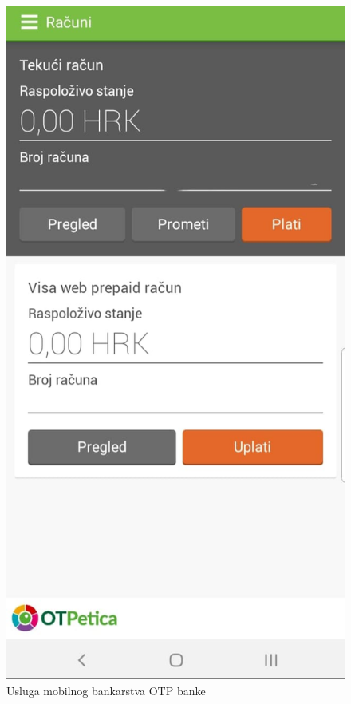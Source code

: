 		\begin{figure}[H]
			\includegraphics[scale=0.25]{slike/motp.JPG}
			\centering
			\caption{Usluga mobilnog bankarstva OTP banke}
			\label{fig:mzaba}
		\end{figure}
		
		\eject